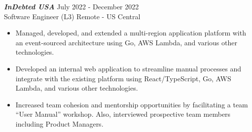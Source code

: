 {\sl \textbf{InDebted USA}} \hfill July 2022 - December 2022 \\ Software Engineer (L3) \hfill Remote - US Central
\begin{itemize}
    \item Managed, developed, and extended a multi-region application platform with an event-sourced architecture using Go, AWS Lambda, and various other technologies.
    \item Developed an internal web application to streamline manual processes and integrate with the existing platform using React/TypeScript, Go, AWS Lambda, and various other technologies.
    \item Increased team cohesion and mentorship opportunities by facilitating a team ``User Manual'' workshop. Also, interviewed prospective team members including Product Managers.
\end{itemize}
